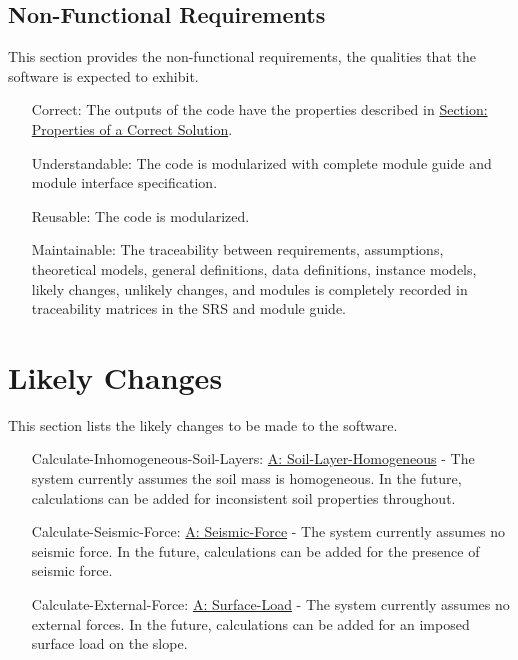 \documentclass[12pt]{article}
\begin{document}
\subsection{Non-Functional Requirements}
\label{Sec:NFRs}
This section provides the non-functional requirements, the qualities that the software is expected to exhibit.

\begin{itemize}
\item[Correct:\phantomsection\label{correct}]The outputs of the code have the properties described in \hyperref[Sec:CorSolProps]{Section: Properties of a Correct Solution}.
\item[Understandable:\phantomsection\label{understandable}]The code is modularized with complete module guide and module interface specification.
\item[Reusable:\phantomsection\label{reusable}]The code is modularized.
\item[Maintainable:\phantomsection\label{maintainable}]The traceability between requirements, assumptions, theoretical models, general definitions, data definitions, instance models, likely changes, unlikely changes, and modules is completely recorded in traceability matrices in the SRS and module guide.
\end{itemize}
\section{Likely Changes}
\label{Sec:LCs}
This section lists the likely changes to be made to the software.

\begin{itemize}
\item[Calculate-Inhomogeneous-Soil-Layers:\phantomsection\label{LC_inhomogeneous}]\hyperref[assumpSLH]{A: Soil-Layer-Homogeneous} - The system currently assumes the soil mass is homogeneous. In the future, calculations can be added for inconsistent soil properties throughout.
\item[Calculate-Seismic-Force:\phantomsection\label{LC_seismic}]\hyperref[assumpSF]{A: Seismic-Force} - The system currently assumes no seismic force. In the future, calculations can be added for the presence of seismic force.
\item[Calculate-External-Force:\phantomsection\label{LC_external}]\hyperref[assumpSL]{A: Surface-Load} - The system currently assumes no external forces. In the future, calculations can be added for an imposed surface load on the slope.
\end{itemize}
\end{document}

